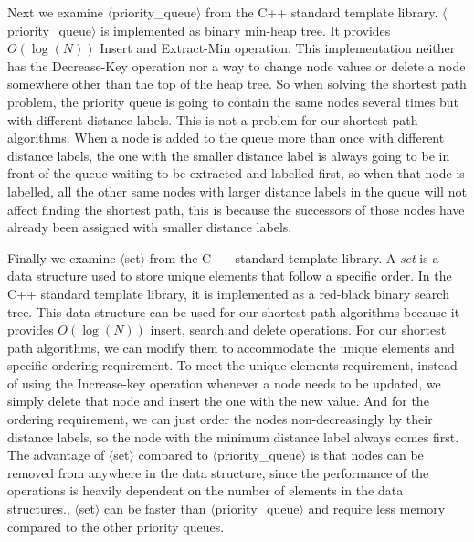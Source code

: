 Next we examine $\langle$priority\_queue$\rangle$ from the C++ standard template library.
$\langle$priority\_queue$\rangle$ is implemented as binary min-heap tree.
It provides $O(\log(N))$ Insert and Extract-Min operation.
This implementation neither has the Decrease-Key operation nor a way to change node values or delete a node somewhere other than the top of the heap tree.
So when solving the shortest path problem,
the priority queue is going to contain the same nodes several times but with different distance labels.
This is not a problem for our shortest path algorithms.
When a node is added to the queue more than once with different distance labels,
the one with the smaller distance label is always going to be in front of the queue waiting to be extracted and labelled first,
so when that node is labelled,
all the other same nodes with larger distance labels in the queue will not affect finding the shortest path,
this is because the successors of those nodes have already been assigned with smaller distance labels.

Finally we examine $\langle$set$\rangle$ from the C++ standard template library.
A \emph{set} is a data structure used to store unique elements that follow a specific order.
In the C++ standard template library, it is implemented as a red-black binary search tree.
This data structure can be used for our shortest path algorithms because it provides $O(\log(N))$ insert, search and delete operations.
For our shortest path algorithms,
we can modify them to accommodate the unique elements and specific ordering requirement.
To meet the unique elements requirement,
instead of using the Increase-key operation whenever a node needs to be updated,
we simply delete that node and insert the one with the new value.
And for the ordering requirement,
we can just order the nodes non-decreasingly by their distance labels,
so the node with the minimum distance label always comes first.
The advantage of $\langle$set$\rangle$ compared to $\langle$priority\_queue$\rangle$ is that nodes can be removed from anywhere in the data structure,
since the performance of the operations is heavily dependent on the number of elements in the data structures.,
$\langle$set$\rangle$ can be faster than $\langle$priority\_queue$\rangle$ and require less memory compared to the other priority queues.

